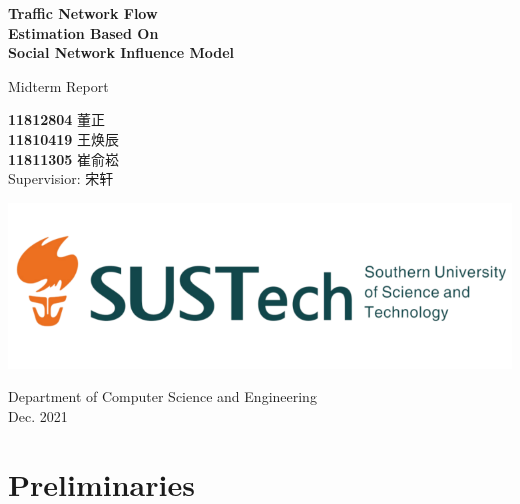 \documentclass[fontset=none]{ctexart}
\theoremstyle{definition}
\theoremstyle{remark}
\begin{document}
\begin{titlepage}
    \begin{center}
        \vspace*{1cm}
            
        \Huge
        \textbf{Traffic Network Flow\\ Estimation Based On\\ Social Network Influence Model}
            
        \vspace{0.5cm}
        \LARGE
        Midterm Report\\
            
        \vspace{1.5cm}
            
        \textbf{11812804}  董\quad 正\\
        \textbf{11810419}  王焕辰\\
        \textbf{11811305}  崔俞崧\\

        \vspace{0.5cm}
        Supervisior: 宋轩
            
        \vfill
            
        \includegraphics[width=\textwidth]{images/sustc.png}
            
        \vspace{0.2cm}
            
        \Large
        Department of Computer Science and Engineering\\
        \vspace{0.5cm}
        Dec. 2021
            
    \end{center}
\end{titlepage}

\tableofcontents

\clearpage
\section{Preliminaries}
\end{document}
